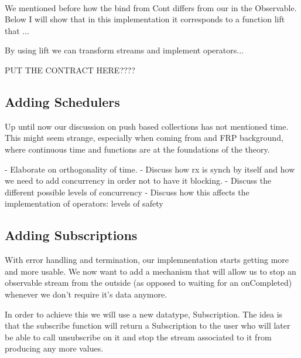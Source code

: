 \\

We mentioned before how the bind from Cont differs from our in the Observable. Below I will show that in this implementation it corresponds to a function lift that ... 

By using lift we can transform streams and implement operators...


PUT THE CONTRACT HERE????

\subsection{Adding Schedulers}
\label{subsec:subsec02}

Up until now our discussion on push based collections has not mentioned time. This might seem strange, especially when coming from and FRP background, where continuous time and functions are at the foundations of the theory. 

- Elaborate on orthogonality of time.
- Discuss how rx is synch by itself and how we need to add concurrency in order not to have it blocking. 
- Discuss the different possible levels of concurrency
- Discuss how this affects the implementation of operators: levels of safety

\subsection{Adding Subscriptions}
\label{subsec:subsec02}

With error handling and termination, our implemnentation starts getting more and more usable. We now want to add a mechanism that will allow us to stop an observable stream from the outside (as opposed to waiting for an onCompleted) whenever we don't require it's data anymore. 

In order to achieve this we will use a new datatype, Subscription. The idea is that the subscribe function will return a Subscription to the user who will later be able to call unsubscribe on it and stop the stream associated to it from producing any more values.

